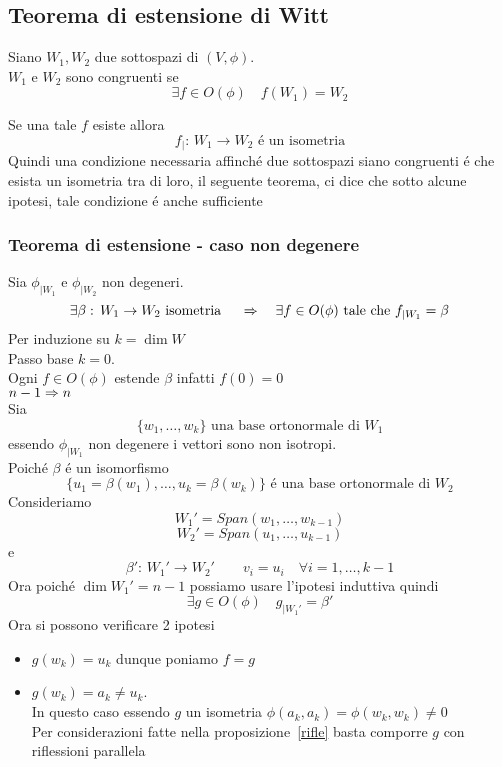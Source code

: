 \subsection{Teorema di estensione di Witt}
\begin{defn}\bianco
Siano $W_1, W_2$ due sottospazi di $(V, \phi)$.\\
$W_1$  e $W_2$ sono congruenti se 
$$\exists f \in O(\phi) \quad f(W_1)=W_2$$
\end{defn}
\begin{oss}Se una tale $f$ esiste allora
$$ f_\vert :\, W_1 \to W_2 \text{ \'e un isometria}$$
Quindi una condizione necessaria affinch\'e due sottospazi siano congruenti \'e che esista un isometria tra di loro, il seguente teorema, ci dice che sotto alcune ipotesi, tale condizione \'e anche sufficiente 
\end{oss}
\subsubsection{Teorema di estensione - caso non degenere}
\begin{thm}\bianco
Sia $\phi_{\vert W_1 } $ e $\phi_{\vert W_2}$ non degeneri.
$$ \exists \beta:\, W_1 \to W_2 \text{ isometria } \quad \Rightarrow \quad \exists f \in O(\phi) \text{ tale che } f_{\vert W_1}=\beta $$
\proof Per induzione su $k=\dim W$ \\
Passo base $k=0 $.\\
Ogni $f \in O(\phi)$ estende $\beta $ infatti $f(0)=0$\\
$n-1 \Rightarrow n $\\
Sia $$\{ w_1, \dots, w_k\} \text{ una base ortonormale di }W_1$$ essendo $\phi_{\vert W_1}$ non degenere i vettori sono non isotropi.\\
Poich\'e $\beta$ \'e un isomorfismo 
$$ \{u_1=\beta(w_1), \dots, u_k =\beta(w_k) \} \text{ \'e una base ortonormale di } W_2$$
Consideriamo 
$$ W_1'=Span(w_1, \dots, w_{k-1})$$
$$ W_2'=Span(u_1, \dots, u_{k-1})$$
e 
$$ \beta':\, W_1' \to W_2' \qquad v_i = u_i \quad \forall i=1, \dots, k-1$$
Ora poich\'e $\dim W_1'=n-1$ possiamo usare l'ipotesi induttiva quindi
$$ \exists g \in O(\phi) \quad g_{\vert W_1'}=\beta'$$
Ora si possono verificare 2 ipotesi
\begin{itemize}
\item $g(w_k)= u_k$ dunque poniamo $f=g$
\item $g(w_k)=a_k \neq u_k$.\\
In questo caso essendo $g$ un isometria $ \phi(a_k,a_k)= \phi(w_k,w_k) \neq 0 $\\
Per considerazioni fatte nella proposizione~\ref{rifle} basta comporre $g$ con riflessioni parallela 
\end{itemize}
\endproof
\end{thm}
